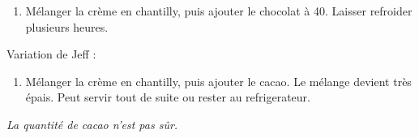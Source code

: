 
\begin{ingredients}
\end{ingredients}


\begin{recipe}
  \begin{enumerate}

  \item M\'elanger la cr\`eme en chantilly, puis ajouter le chocolat
    \`a 40\degreeC.  Laisser refroider plusieurs heures.

  \end{enumerate}

\end{recipe}


Variation de Jeff :

\begin{ingredients}
\end{ingredients}


\begin{recipe}
  \begin{enumerate}

  \item M\'elanger la cr\`eme en chantilly, puis ajouter le cacao.  Le
    m\'elange devient tr\`es \'epais.  Peut servir tout de suite ou
    rester au refrigerateur.

  \end{enumerate}

  \textit{La quantit\'e de cacao n'est pas s\^ur.}
  
\end{recipe}

